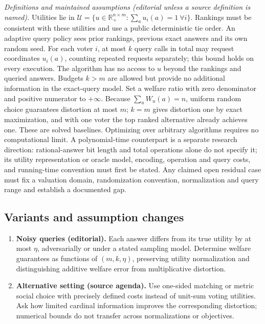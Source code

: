 \documentclass[11pt,a4paper]{article}
\begin{document}
\emph{Definitions and maintained assumptions (editorial unless a source definition is named).} Utilities lie in \(\mathcal U=\{u\in\mathbb R_+^{n\times m}:\sum_a u_i(a)=1\ \forall i\}\). Rankings must be consistent with these utilities and use a public deterministic tie order. An adaptive query policy sees prior rankings, previous exact answers and its own random seed. For each voter \(i\), at most \(k\) query calls in total may request coordinates \(u_i(a)\), counting repeated requests separately; this bound holds on every execution. The algorithm has no access to \(u\) beyond the rankings and queried answers. Budgets \(k>m\) are allowed but provide no additional information in the exact-query model. Set a welfare ratio with zero denominator and positive numerator to \(+\infty\). Because \(\sum_a W_u(a)=n\), uniform random choice guarantees distortion at most \(m\); \(k=m\) gives distortion one by exact maximization, and with one voter the top ranked alternative already achieves one. These are solved baselines. Optimizing over arbitrary algorithms requires no computational limit. A polynomial-time counterpart is a separate research direction: rational-answer bit length and total operations alone do not specify it; its utility representation or oracle model, encoding, operation and query costs, and running-time convention must first be stated. Any claimed open residual case must fix a valuation domain, randomization convention, normalization and query range and establish a documented gap.
\subsection*{Variants and assumption changes}
\begin{enumerate}
\item \textbf{Noisy queries (editorial).} Each answer differs from its true utility by at most \(\eta\), adversarially or under a stated sampling model. Determine welfare guarantees as functions of \((m,k,\eta)\), preserving utility normalization and distinguishing additive welfare error from multiplicative distortion.
\item \textbf{Alternative setting (source agenda).} Use one-sided matching or metric social choice with precisely defined costs instead of unit-sum voting utilities. Ask how limited cardinal information improves the corresponding distortion; numerical bounds do not transfer across normalizations or objectives.
\end{enumerate}
\end{document}
